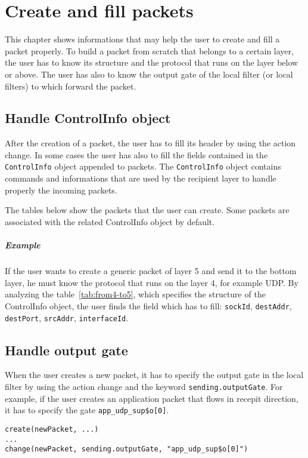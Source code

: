 

\chapter{Create and fill packets}
\label{ch:appendix-C}

This chapter shows informations that may help the user to create and fill a packet properly. To build a packet from scratch that belongs to a certain layer, the user has to know its structure and the protocol that runs on the layer below or above. The user has also to know the output gate of the local filter (or local filters) to which forward the packet.

\section{Handle ControlInfo object}

After the creation of a packet, the user has to fill its header by using the action change. In some cases the user has also to fill the fields contained in the \texttt{ControlInfo} object appended to packets. The \texttt{ControlInfo} object contains commands and informations that are used by the recipient layer to handle properly the incoming packets.

The tables below show the packets that the user can create. Some packets are associated with the related ControlInfo object by default.

\paragraph{Example}
If the user wants to create a generic packet of layer 5 and send it to the bottom layer, he must know the protocol that runs on the layer 4, for example UDP. By analyzing the table~\ref{tab:from4-to5}, which specifies the structure of the ControlInfo object, the user finds the field which has to fill: \texttt{sockId}, \texttt{destAddr}, \texttt{destPort}, \texttt{srcAddr}, \texttt{interfaceId}.


\section{Handle output gate}
When the user creates a new packet, it has to specify the output gate in the local filter by using the action change and the keyword \texttt{sending.outputGate}. For example, if the user creates an application packet that flows in recepit direction, it has to specify the gate \texttt{app\_udp\_sup\$o[0]}.
%
\begin{lstlisting}[language={asl}, caption={Handle output gate example}]
create(newPacket, ...)
...
change(newPacket, sending.outputGate, "app_udp_sup$o[0]")
\end{lstlisting}




